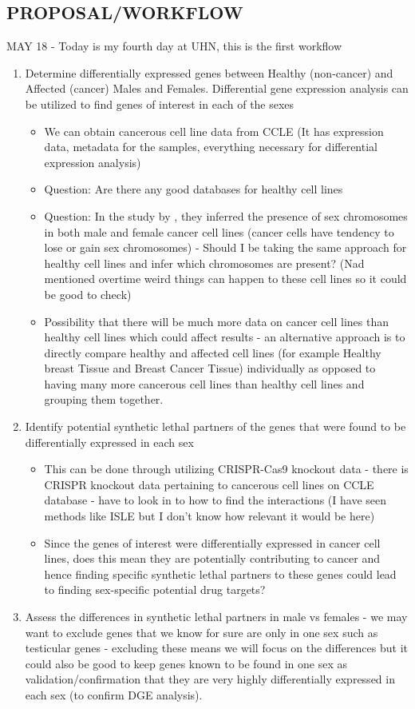\documentclass[10pt]{article}
\begin{document}
\subsection{PROPOSAL/WORKFLOW}
MAY 18 - Today is my fourth day at UHN, this is the first workflow
\begin{enumerate}
	\item Determine differentially expressed genes between Healthy (non-cancer) and Affected (cancer) Males and Females. Differential gene expression analysis can be utilized to find genes of interest in each of the sexes
	\begin{itemize}
		\item We can obtain cancerous cell line data from CCLE (It has expression data, metadata for the samples, everything necessary for differential expression analysis)
		\item Question: Are there any good databases for healthy cell lines
		\item Question: In the study by \citet{shohat2022gene}, they inferred the presence of sex chromosomes in both male and female cancer cell lines (cancer cells have tendency to lose or gain sex chromosomes) - Should I be taking the same approach for healthy cell lines and infer which chromosomes are present? (Nad mentioned overtime weird things can happen to these cell lines so it could be good to check)
		\item Possibility that there will be much more data on cancer cell lines than healthy cell lines which could affect results - an alternative approach is to directly compare healthy and affected cell lines (for example Healthy breast Tissue and Breast Cancer Tissue) individually as opposed to having many more cancerous cell lines than healthy cell lines and grouping them together.
	\end{itemize}
	\item Identify potential synthetic lethal partners of the genes that were found to be differentially expressed in each sex
	\begin{itemize}
		\item This can be done through utilizing CRISPR-Cas9 knockout data - there is CRISPR knockout data pertaining to cancerous cell lines on CCLE database - have to look in to how to find the interactions (I have seen methods like ISLE but I don't know how relevant it would be here)
		\item Since the genes of interest were differentially expressed in cancer cell lines, does this mean they are potentially contributing to cancer and hence finding specific synthetic lethal partners to these genes could lead to finding sex-specific potential drug targets?
	\end{itemize}
	\item Assess the differences in synthetic lethal partners in male vs females - we may want to exclude genes that we know for sure are only in one sex such as testicular genes - excluding these means we will focus on the differences but it could also be good to keep genes known to be found in one sex as validation/confirmation that they are very highly differentially expressed in each sex (to confirm DGE analysis).
\end{enumerate}
\end{document}
